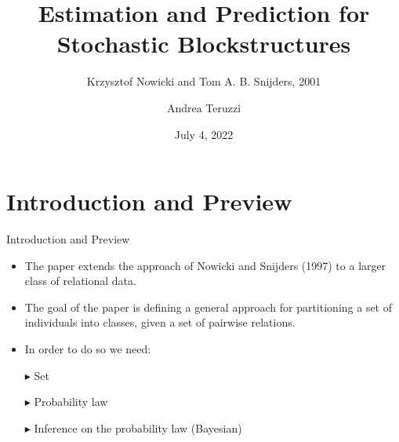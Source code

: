 \documentclass[aspectratio=169,xcolor=dvipsnames]{beamer}
\title[Nowicki and Snijders '01]{Estimation and Prediction for Stochastic Blockstructures} \subtitle{Krzysztof Nowicki and Tom A. B. Snijders, 2001}
\author[andrea.teruzzi@proton.me] {Andrea Teruzzi}
\date[VSI – BayesLab]{July 4, 2022}
\begin{document}
\begin{frame}
    \titlepage
\end{frame}



\section{Introduction and Preview}
\begin{frame}{Introduction and Preview}
\begin{itemize}
    \item The paper extends the approach of Nowicki and Snijders (1997) to a larger class of relational data.
    \pause
    \item The goal of the paper is defining a general approach for partitioning a set of individuals into classes, given a set of pairwise relations.
    \pause
    \item In order to do so we need:
        \pause
        \addtolength{\itemindent}{12pt}
        \pause
        \item[$\blacktriangleright$] Set
        \pause
        \item[$\blacktriangleright$] Probability law
        \pause
        \item[$\blacktriangleright$] Inference on the probability law (Bayesian)
\end{itemize}
\end{frame}

\end{document}
